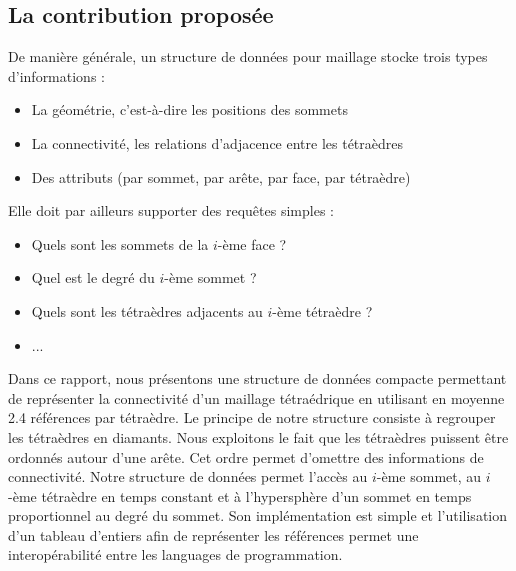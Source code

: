 \subsection*{La contribution proposée}
\noindent
De manière générale, un structure de données pour maillage stocke trois types d'informations :
\begin{itemize}
\item La géométrie, c'est-à-dire les positions des sommets
\item La connectivité, les relations d'adjacence entre les tétraèdres
\item Des attributs (par sommet, par arête, par face, par tétraèdre)\\
\end{itemize}
Elle doit par ailleurs supporter des requêtes simples :
\begin{itemize}
\item Quels sont les sommets de la $i$-ème face ?
\item Quel est le degré du $i$-ème sommet ?
\item Quels sont les tétraèdres adjacents au $i$-ème tétraèdre ?
\item ...
\end{itemize}
Dans ce rapport, nous présentons une structure de données compacte permettant de représenter la connectivité d'un maillage tétraédrique en utilisant en moyenne 2.4 références par tétraèdre. Le principe de notre structure consiste à regrouper les tétraèdres en diamants. Nous exploitons le fait que les tétraèdres puissent être ordonnés autour d'une arête. Cet ordre permet d'omettre des informations de connectivité. Notre structure de données permet l'accès au $i$-ème sommet, au $i$-ème tétraèdre en temps constant et à l'hypersphère d'un sommet en temps proportionnel au degré du sommet. Son implémentation est simple et l'utilisation d'un tableau d'entiers afin de représenter les références permet une interopérabilité entre les languages de programmation.

